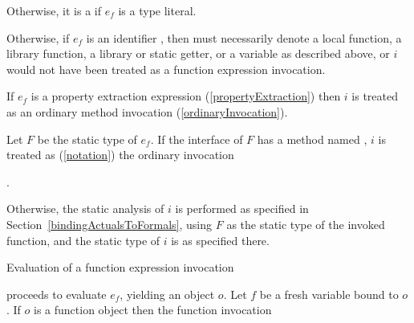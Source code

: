\documentclass[makeidx]{article}
\begin{document}
{

\LMHash{}%
Otherwise, it is a  if $e_f$ is a type literal.


\LMHash{}%
Otherwise, if $e_f$ is an identifier \id, then \id{} must necessarily denote
a local function, a library function, a library or static getter,
or a variable as described above,
or $i$ would not have been treated as a function expression invocation.

\LMHash{}%
If $e_f$ is a property extraction expression
(\ref{propertyExtraction})
then $i$ is treated as an ordinary method invocation
(\ref{ordinaryInvocation}).


\LMHash{}%
Let $F$ be the static type of $e_f$.
If the interface of $F$ has a method named \CALL,
$i$ is treated as
(\ref{notation})
the ordinary invocation

\noindent
{}.

\LMHash{}%
Otherwise, the static analysis of $i$ is performed as specified
in Section~\ref{bindingActualsToFormals},
using $F$ as the static type of the invoked function,
and the static type of $i$ is as specified there.

\LMHash{}%
Evaluation of a function expression invocation

\noindent
{}

\noindent
proceeds to evaluate $e_f$, yielding an object $o$.
Let $f$ be a fresh variable bound to $o$.
If $o$ is a function object then the function invocation

}
\end{document}
